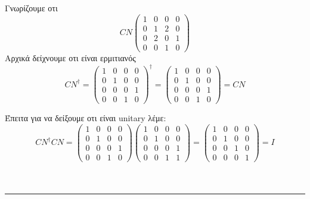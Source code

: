 \documentclass[12pt]{article}
\begin{document}
\section*{{}}  
Γνωρίζουμε οτι $$CN \begin{pmatrix*}
    1 &0& 0& 0\\
    0 &1 &2& 0 \\ 
    0 &2& 0 &1 \\ 
    0 &0 &1 &0
\end{pmatrix*} $$
Αρχικά δείχνουμε οτι είναι ερμιτιανός 
$$CN^\dag =    \begin{pmatrix*}
    1 &0& 0& 0\\
    0 &1 &0& 0 \\ 
    0 &0& 0 &1 \\ 
    0 &0 &1 &0
\end{pmatrix*}^\dag = \begin{pmatrix*}
    1 &0& 0& 0\\
    0 &1 &0& 0 \\ 
    0 &0& 0 &1 \\ 
    0 &0 &1 &0
\end{pmatrix*} = CN $$

 Έπειτα για να δείξουμε οτι είναι \textlatin{unitary} λέμε:
 $$CN ^\dag CN =    \begin{pmatrix*}
    1 &0& 0& 0\\
    0 &1 &0& 0 \\ 
    0 &0& 0 &1 \\ 
    0 &0 &1 &0
\end{pmatrix*}\begin{pmatrix*}
    1 &0& 0& 0\\
    0 &1 &0& 0 \\ 
    0 &0& 0 &1 \\ 
    0 &0 &1 &1
\end{pmatrix*} = \begin{pmatrix*}
    1 &0& 0& 0\\
    0 &1 &0& 0 \\ 
    0 &0& 1 &0 \\ 
    0 &0 &0 &1 
\end{pmatrix*} = Ι$$\\ \\
\rule{\textwidth}{.5pt}
\end{document}
